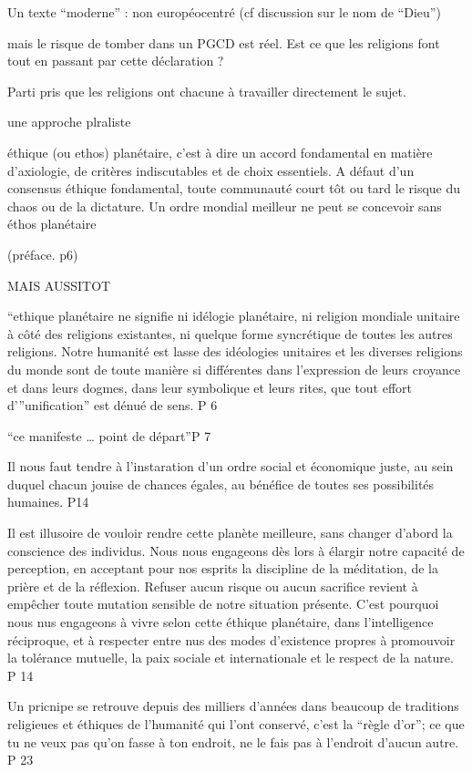         Un texte “moderne” : non européocentré (cf discussion sur le nom de “Dieu”)

        mais le risque de tomber dans un PGCD est réel. Est ce que les religions font tout en passant par cette déclaration ?

        Parti pris que les religions ont chacune à travailler directement le sujet.

        une approche plraliste
\begin{singlequote}
éthique (ou ethos) planétaire, c’est à dire un accord fondamental en matière d’axiologie, de critères indiscutables et de choix essentiels. A défaut d’un consensus éthique fondamental, toute communauté court tôt ou tard le risque du chaos ou de la dictature.  Un ordre mondial meilleur ne peut se concevoir sans éthos planétaire

        (préface. p6)

\end{singlequote}

        MAIS AUSSITOT
\begin{singlequote}
“ethique planétaire ne signifie ni idélogie planétaire, ni religion mondiale unitaire à côté des religions existantes, ni quelque forme syncrétique de toutes les autres religions. Notre humanité est lasse des idéologies unitaires et les diverses religions du monde sont de toute manière si différentes dans l’expression de leurs croyance et dans leurs dogmes, dans leur symbolique et leurs rites, que tout effort d’”unification” est dénué de sens. P 6

\end{singlequote}


“ce manifeste … point de départ”P 7

\begin{singlequote}

Il nous faut tendre à l’instaration d’un ordre social et économique juste, au sein duquel chacun jouise de chances égales, au bénéfice de toutes ses possibilités humaines. P14

        Il est illusoire de vouloir rendre cette planète meilleure, sans changer d’abord la conscience des individus. Nous nous engageons dès lors à élargir notre capacité de perception, en acceptant pour nos esprits la discipline de la méditation, de la prière et de la réflexion. Refuser aucun risque ou aucun sacrifice revient à empêcher toute mutation sensible de notre situation présente. C’est pourquoi nous nus engageons à vivre selon cette éthique planétaire, dans l’intelligence réciproque, et à respecter entre nus des modes d’existence propres à promouvoir la tolérance mutuelle, la paix sociale et internationale et le respect de la nature. P 14

        Un pricnipe se retrouve depuis des milliers d’années dans beaucoup de traditions religieues et éthiques de l’humanité qui l’ont conservé, c’est la “règle d’or”; ce que tu ne veux pas qu’on fasse à ton endroit, ne le fais pas à l’endroit d’aucun autre. P 23
\end{singlequote}
        
